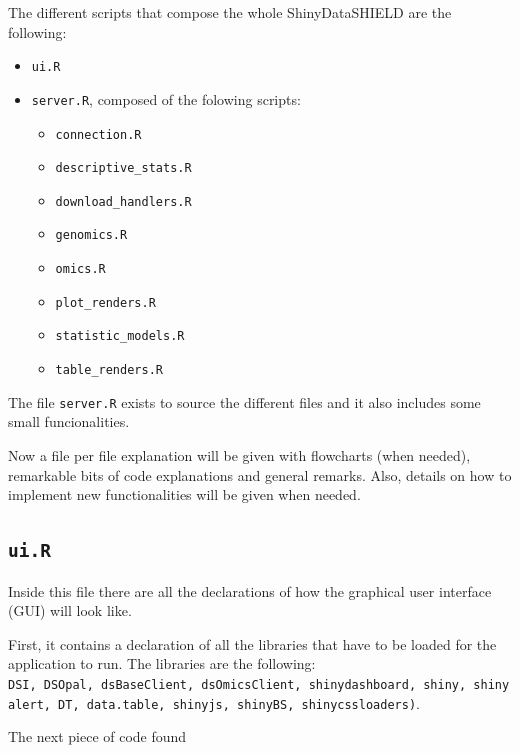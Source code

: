 \documentclass[
]{book}
\newenvironment{Shaded}{\begin{snugshade}}{\end{snugshade}}
\newcommand{\NormalTok}[1]{#1}
\newcommand{\StringTok}[1]{\textcolor[rgb]{0.31,0.60,0.02}{#1}}
\providecommand{\tightlist}{%
  \setlength{\itemsep}{0pt}\setlength{\parskip}{0pt}}
\begin{document}
The different scripts that compose the whole ShinyDataSHIELD are the following:

\begin{itemize}
\tightlist
\item
  \texttt{ui.R}
\item
  \texttt{server.R}, composed of the folowing scripts:

  \begin{itemize}
  \tightlist
  \item
    \texttt{connection.R}
  \item
    \texttt{descriptive\_stats.R}
  \item
    \texttt{download\_handlers.R}
  \item
    \texttt{genomics.R}
  \item
    \texttt{omics.R}
  \item
    \texttt{plot\_renders.R}
  \item
    \texttt{statistic\_models.R}
  \item
    \texttt{table\_renders.R}
  \end{itemize}
\end{itemize}

The file \texttt{server.R} exists to source the different files and it also includes some small funcionalities.

Now a file per file explanation will be given with flowcharts (when needed), remarkable bits of code explanations and general remarks. Also, details on how to implement new functionalities will be given when needed.

\hypertarget{ui.r}{%
\subsection{\texorpdfstring{\texttt{ui.R}}{ui.R}}\label{ui.r}}

Inside this file there are all the declarations of how the graphical user interface (GUI) will look like.

First, it contains a declaration of all the libraries that have to be loaded for the application to run. The libraries are the following: \texttt{DSI,\ DSOpal,\ dsBaseClient,\ dsOmicsClient,\ shinydashboard,\ shiny,\ shinyalert,\ DT,\ data.table,\ shinyjs,\ shinyBS,\ shinycssloaders)}.

The next piece of code found

\begin{Shaded}
\end{Shaded}
\end{document}
